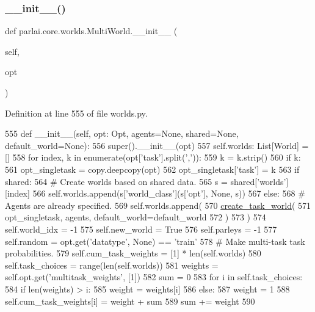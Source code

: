 \subsubsection{\texorpdfstring{\+\_\+\+\_\+init\+\_\+\+\_\+()}{\_\_init\_\_()}}
{\footnotesize\ttfamily def parlai.\+core.\+worlds.\+Multi\+World.\+\_\+\+\_\+init\+\_\+\+\_\+ (\begin{DoxyParamCaption}\item[{}]{self,  }\item[{}]{opt }\end{DoxyParamCaption})}



Definition at line 555 of file worlds.\+py.


\begin{DoxyCode}
555     \textcolor{keyword}{def }\_\_init\_\_(self, opt: Opt, agents=\textcolor{keywordtype}{None}, shared=\textcolor{keywordtype}{None}, default\_world=\textcolor{keywordtype}{None}):
556         super().\_\_init\_\_(opt)
557         self.worlds: List[World] = []
558         \textcolor{keywordflow}{for} index, k \textcolor{keywordflow}{in} enumerate(opt[\textcolor{stringliteral}{'task'}].split(\textcolor{stringliteral}{','})):
559             k = k.strip()
560             \textcolor{keywordflow}{if} k:
561                 opt\_singletask = copy.deepcopy(opt)
562                 opt\_singletask[\textcolor{stringliteral}{'task'}] = k
563                 \textcolor{keywordflow}{if} shared:
564                     \textcolor{comment}{# Create worlds based on shared data.}
565                     s = shared[\textcolor{stringliteral}{'worlds'}][index]
566                     self.worlds.append(s[\textcolor{stringliteral}{'world\_class'}](s[\textcolor{stringliteral}{'opt'}], \textcolor{keywordtype}{None}, s))
567                 \textcolor{keywordflow}{else}:
568                     \textcolor{comment}{# Agents are already specified.}
569                     self.worlds.append(
570                         \hyperlink{namespaceparlai_1_1core_1_1worlds_ae4ed098adcaad6ec7563e665485ccdcf}{create\_task\_world}(
571                             opt\_singletask, agents, default\_world=default\_world
572                         )
573                     )
574         self.world\_idx = -1
575         self.new\_world = \textcolor{keyword}{True}
576         self.parleys = -1
577         self.random = opt.get(\textcolor{stringliteral}{'datatype'}, \textcolor{keywordtype}{None}) == \textcolor{stringliteral}{'train'}
578         \textcolor{comment}{# Make multi-task task probabilities.}
579         self.cum\_task\_weights = [1] * len(self.worlds)
580         self.task\_choices = range(len(self.worlds))
581         weights = self.opt.get(\textcolor{stringliteral}{'multitask\_weights'}, [1])
582         sum = 0
583         \textcolor{keywordflow}{for} i \textcolor{keywordflow}{in} self.task\_choices:
584             \textcolor{keywordflow}{if} len(weights) > i:
585                 weight = weights[i]
586             \textcolor{keywordflow}{else}:
587                 weight = 1
588             self.cum\_task\_weights[i] = weight + sum
589             sum += weight
590 
\end{DoxyCode}


